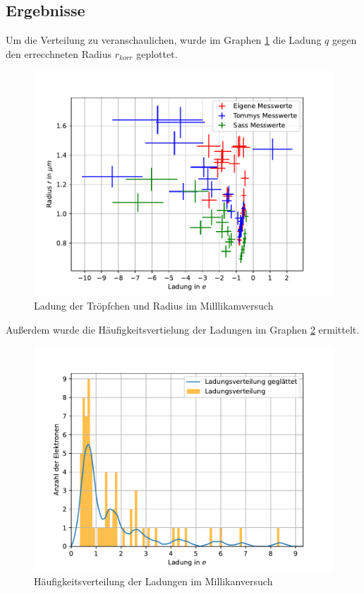 \documentclass[11pt, a4paper]{article}
\begin{document}
    \subsection{Ergebnisse}
    Um die Verteilung zu veranschaulichen, wurde im Graphen \ref{fig:milllikam} die Ladung $q$ gegen den errecchneten Radius $r_{korr}$ geplottet.
    \begin{figure}[h]
        \centering
        \includegraphics[width=\textwidth]{millikan.pdf}
        \caption{Ladung der Tröpfchen und Radius im Milllikamversuch}
        \label{fig:milllikam}
    \end{figure}
    Außerdem wurde die Häufigkeitsvertielung der Ladungen im Graphen \ref{fig:hauf} ermittelt.

    \begin{figure}[h]
        \centering
        \includegraphics[width=\textwidth]{Ladungsverteilung.pdf}
        \caption{Häufigkeitsverteilung der Ladungen im Millikanversuch}
        \label{fig:hauf}
    \end{figure}
    
\end{document}
